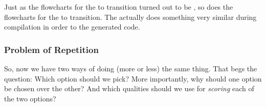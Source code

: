Just as the flowcharts for the  to  transition turned out to be , so does the flowcharts for the  to  transition. The  actually does something very similar during compilation in order to  the generated code.

\subsubsection{Problem of Repetition}

So, now we have two ways of doing (more or less) the same thing. That begs the question: Which option should we pick? More importantly, why should one option be chosen over the other? And which qualities should we use for \textsl{scoring} each of the two options?

